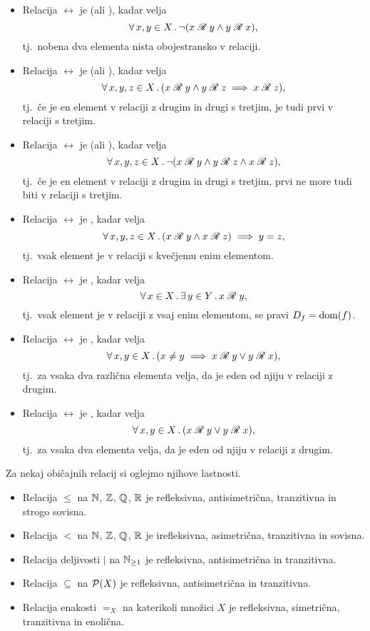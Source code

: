 \begin{definicija}
\begin{itemize}
				\item
					Relacija $\rel$ je  (ali ), kadar velja
					\[\xall{x, y}[X]{\lnot(\rel[x][y] \land \rel[y][x])},\]
					tj.~nobena dva elementa nista obojestransko v relaciji.
				\item
					Relacija $\rel$ je  (ali ), kadar velja
					\[\all{x, y, z}[X]{\rel[x][y] \land \rel[y][z] \implies \rel[x][z]},\]
					tj.~če je en element v relaciji z drugim in drugi s tretjim, je tudi prvi v relaciji s tretjim.
				\item
					Relacija $\rel$ je  (ali ), kadar velja
					\[\xall{x, y, z}[X]{\lnot(\rel[x][y] \land \rel[y][z] \land \rel[x][z])},\]
					tj.~če je en element v relaciji z drugim in drugi s tretjim, prvi ne more tudi biti v relaciji s tretjim.
				\item
					Relacija $\rel$ je , kadar velja
					\[\all{x, y, z}[X]{\rel[x][y] \land \rel[x][z]} \implies y = z,\]
					tj.~vsak element je v relaciji s kvečjemu enim elementom.
				\item
					Relacija $\rel$ je , kadar velja
					\[\xall{x}[X]{\xsome{y}[Y]{\rel[x][y]}},\]
					tj.~vsak element je v relaciji z vsaj enim elementom, se pravi $D_{f} = \mathrm{dom}(f)$.
				\item
					Relacija $\rel$ je , kadar velja
					\[\all{x, y}[X]{x \neq y \implies \rel[x][y] \lor \rel[y][x]},\]
					tj.~za vsaka dva različna elementa velja, da je eden od njiju v relaciji z drugim.
				\item
					Relacija $\rel$ je , kadar velja
					\[\all{x, y}[X]{\rel[x][y] \lor \rel[y][x]},\]
					tj.~za vsaka dva elementa velja, da je eden od njiju v relaciji z drugim.
			\end{itemize}
		\end{definicija}
		
		\begin{zgled}
			Za nekaj običajnih relacij si oglejmo njihove lastnosti.
			\begin{itemize}
				\item
					Relacija $\leq$ na $\mathbb{N}$, $\mathbb{Z}$, $\mathbb{Q}$, $\mathbb{R}$ je refleksivna, antisimetrična, tranzitivna in strogo sovisna.
				\item
					Relacija $<$ na $\mathbb{N}$, $\mathbb{Z}$, $\mathbb{Q}$, $\mathbb{R}$ je irefleksivna, asimetrična, tranzitivna in sovisna.
				\item
					Relacija deljivosti $|$ na $\mathbb{N}_{\geq 1}$ je refleksivna, antisimetrična in tranzitivna.
				\item
					Relacija $\subseteq$ na $\mathcal{P}(X)$ je refleksivna, antisimetrična in tranzitivna.
				\item
					Relacija enakosti $=_X$ na katerikoli množici $X$ je refleksivna, simetrična, tranzitivna in enolična.
			\end{itemize}
		\end{zgled}
		
